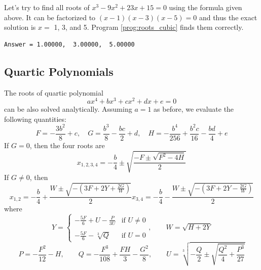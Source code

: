 \nopagebreak[4]
\begin{example}\label{ex:roots_cubic}

\nopagebreak[4]
\noindent
Let's try to find all roots of $x^3 -9 x^2 + 23 x + 15=0$ using the formula given above.  It can be factorized to $(x-1)(x-3)(x-5)=0$ and thus the exact solution is $x=$ 1, 3, and 5. Program \ref{prog:roots_cubic} finds them correctly.

\begin{mybox}
\small
\begin{verbatim}
Answer = 1.00000,  3.00000,  5.00000
\end{verbatim}
\normalsize
\end{mybox}
\end{example}

\subsection{Quartic Polynomials}

The roots of quartic polynomial
\begin{equation}
a x^4 + b x^3 + c x^2 + d x + e = 0
\end{equation}
can be also solved analytically.  Assuming $a=1$ as before, we evaluate the following quantities:
\begin{equation}
F  =- \frac{3 b^2}{8}  + c , \quad
G  = \frac{b^3}{8} - \frac{b c}{2} + d, \quad
H  = - \frac{b^4}{256} + \frac{b^2 c}{16} - \frac{b d}{4} + e
\end{equation}
If $G=0$, then the four roots are
\begin{equation}
x_{1,2,3,4} = -\frac{b}{4} \pm \sqrt{\frac{-F \pm \sqrt{F^2-4H}}{2}}
\label{eq:quartic_roots1}
\end{equation}
If $G \neq 0$, then
\begin{subequations}
\begin{equation}
x_{1,2} = -\frac{b}{4} + \frac{W \pm \sqrt{-\left (3F + 2Y + \frac{2G}{W}\right )}}{2}
\end{equation}
\begin{equation}
x_{3,4} = -\frac{b}{4} - \frac{W \pm \sqrt{-\left (3F + 2Y - \frac{2G}{W}\right )}}{2}
\end{equation}
\label{eq:quartic_roots2}
\end{subequations}
where
\begin{equation}
Y = \begin{cases}
-\displaystyle\frac{5F}{6} + U - \frac{P}{3U} & \text{if } U \ne 0 \\
\\
-\displaystyle\frac{5F}{6} - \sqrt[3]{Q} & \text{if } U=0
\end{cases}, \qquad  W = \sqrt{H+2Y} 
\end{equation}
\begin{equation}
P = -\frac{F^2}{12}-H, \qquad Q = -\frac{F^3}{108} + \frac{F H}{3} - \frac{G^2}{8}, \qquad  U = \sqrt[3]{- \frac{Q}{2}\pm \sqrt{\frac{Q^2}{4}+\frac{P^3}{27}}}
\end{equation}

